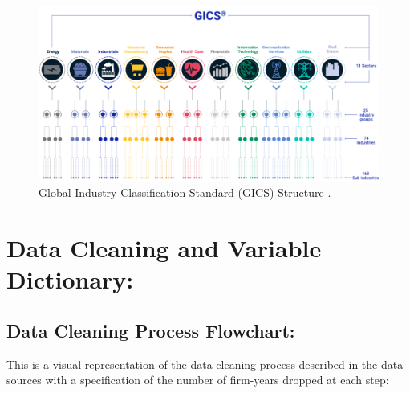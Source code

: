 \begin{figure}[H]
\begin{center}
\includegraphics[width=5in]{figures/gics.png}
\caption{Global Industry Classification Standard (GICS) Structure \cite{GICS_MSCI}.}
\label{fig:label1}
\end{center}
\end{figure}

\section{Data Cleaning and Variable Dictionary:}

\newpage 
 \subsection{Data Cleaning Process Flowchart:}
\noindent This is a visual representation of the data cleaning process described in the data sources with a specification of the number of firm-years dropped at each step: 

\bigskip

